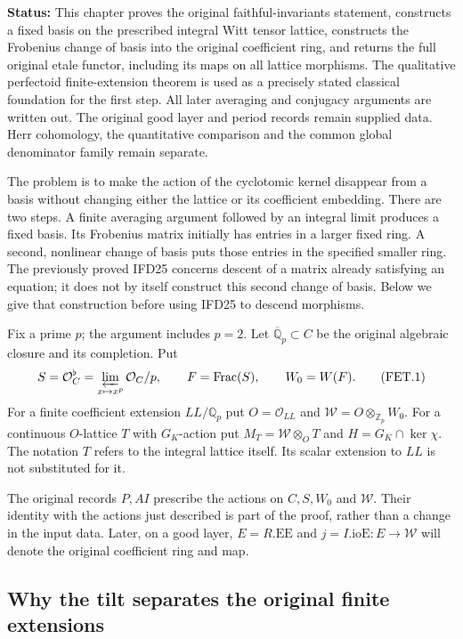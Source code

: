 \documentclass[11pt,a4paper]{article}
\numberwithin{equation}{section}
\theoremstyle{remark}\newtheorem{remark}[theorem]{Remark}
\newcommand{\status}[1]{\textbf{Status:} #1}
\begin{document}
\status{This chapter proves the original faithful-invariants statement,
constructs a fixed basis on the prescribed integral Witt tensor lattice,
constructs the Frobenius change of basis into the original coefficient
ring, and returns the full original etale functor, including its maps on
all lattice morphisms. The qualitative perfectoid finite-extension
theorem is used as a precisely stated classical foundation for the first
step. All later averaging and conjugacy arguments are written out.
The original good layer and period records remain supplied data.
Herr cohomology, the quantitative comparison and the common global
denominator family remain separate.}

The problem is to make the action of the cyclotomic kernel disappear
from a basis without changing either the lattice or its coefficient
embedding. There are two steps. A finite averaging argument followed by
an integral limit produces a fixed basis. Its Frobenius matrix initially
has entries in a larger fixed ring. A second, nonlinear change of basis
puts those entries in the specified smaller ring. The previously proved
IFD25 concerns descent of a matrix already satisfying an equation; it
does not by itself construct this second change of basis. Below we give
that construction before using IFD25 to descend morphisms.

Fix a prime $p$; the argument includes $p=2$. Let
$\overline{\mathbb Q}_p\subset C$ be the original algebraic closure
and its completion. Put
\[
 S=\mathcal O_C^\flat=\varprojlim_{x\mapsto x^p}\mathcal O_C/p,
 \qquad F=\operatorname{Frac}(S),\qquad W_0=W(F).
                                                        \tag{FET.1}
\]
For a finite coefficient extension $LL/\mathbb Q_p$ put
$O=\mathcal O_{LL}$ and $\mathcal W=O\otimes_{\mathbb Z_p}W_0$.
For a continuous $O$-lattice $T$ with $G_K$-action put
$M_T=\mathcal W\otimes_O T$ and $H=G_K\cap\ker\chi$.
The notation $T$ refers to the integral lattice itself. Its scalar
extension to $LL$ is not substituted for it.

The original records $P,AI$ prescribe the actions on $C,S,W_0$ and
$\mathcal W$. Their identity with the actions just described is part of
the proof, rather than a change in the input data. Later, on a good
layer, $E=R.\mathrm{EE}$ and $j=I.\mathrm{ioE}:E\to\mathcal W$
will denote the original coefficient ring and map.

\subsection{Why the tilt separates the original finite extensions}
\end{document}
